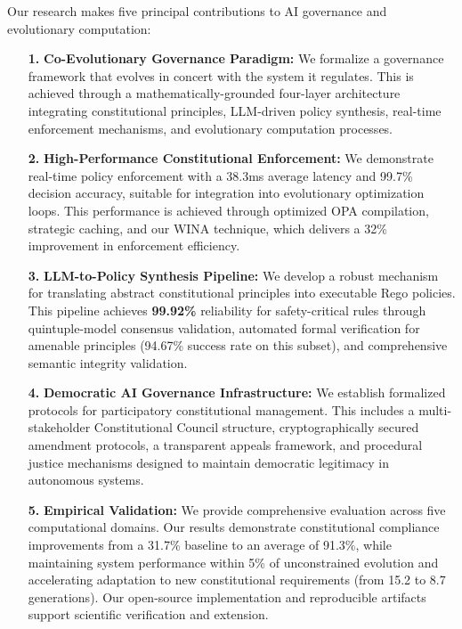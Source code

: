 \documentclass[manuscript,screen,9pt]{acmart}
\begin{document}
Our research makes five principal contributions to AI governance and evolutionary computation:
\begin{enumerate}[leftmargin=*,itemsep=2pt,parsep=1pt]
    \item[\textbf{1.}] \textbf{Co-Evolutionary Governance Paradigm:} We formalize a governance framework that evolves in concert with the system it regulates. This is achieved through a mathematically-grounded four-layer architecture integrating constitutional principles, LLM-driven policy synthesis, real-time enforcement mechanisms, and evolutionary computation processes.
    
    \item[\textbf{2.}] \textbf{High-Performance Constitutional Enforcement:} We demonstrate real-time policy enforcement with a 38.3ms average latency and 99.7\% decision accuracy, suitable for integration into evolutionary optimization loops. This performance is achieved through optimized OPA compilation, strategic caching, and our WINA technique, which delivers a 32\% improvement in enforcement efficiency.
    
    \item[\textbf{3.}] \textbf{LLM-to-Policy Synthesis Pipeline:} We develop a robust mechanism for translating abstract constitutional principles into executable Rego policies. This pipeline achieves \textbf{99.92\%} reliability for safety-critical rules through quintuple-model consensus validation, automated formal verification for amenable principles (94.67\% success rate on this subset), and comprehensive semantic integrity validation.
    
    \item[\textbf{4.}] \textbf{Democratic AI Governance Infrastructure:} We establish formalized protocols for participatory constitutional management. This includes a multi-stakeholder Constitutional Council structure, cryptographically secured amendment protocols, a transparent appeals framework, and procedural justice mechanisms designed to maintain democratic legitimacy in autonomous systems.
    
    \item[\textbf{5.}] \textbf{Empirical Validation:} We provide comprehensive evaluation across five computational domains. Our results demonstrate constitutional compliance improvements from a 31.7\% baseline to an average of 91.3\%, while maintaining system performance within 5\% of unconstrained evolution and accelerating adaptation to new constitutional requirements (from 15.2 to 8.7 generations). Our open-source implementation and reproducible artifacts support scientific verification and extension.
\end{enumerate}
\end{document}
